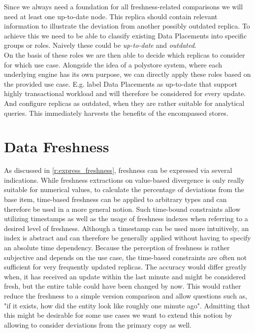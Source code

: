 Since we always need a foundation for all freshness-related comparisons we will need at least one up-to-date node. 
This replica should contain relevant information to illustrate the deviation from another possibly outdated replica.
To achieve this we need to be able to classify existing Data Placements into specific groups or roles.
Naively these could be \emph{up-to-date} and \emph{outdated}.\\
On the basis of these roles we are then able to decide which replicas to consider for which use case.
Alongside the idea of a polystore system, where each underlying engine has its own purpose, we can directly apply these roles 
based on the provided use case. E.g. label Data Placements as up-to-date that support highly transactional workload and will therefore be considered for every update.
And configure replicas as outdated, when they are rather suitable for analytical queries.
This immediately harvests the benefits of the encompassed stores. \\








\section{Data Freshness}
\label{express}

As discussed in \ref{r:express_freshness}, freshness can be expressed via several indications.
While freshness extractions on value-based divergence is only really suitable for numerical values,
to calculate the percentage of deviations from the base item, time-based freshness can be applied to arbitrary types and can therefore be used 
in a more general notion. 
Such time-bound constraints allow utilizing timestamps as well as the usage of freshness indexes when referring to a desired level of freshness. 
Although a timestamp can be used more intuitively, an index is abstract and can therefore be generally applied without having to specify an absolute time dependency.
Because the perception of freshness is rather subjective and depends on the use case, the time-based constraints are often not sufficient for very frequently updated replicas.
The accuracy would differ greatly when, it has received an update within the last minute and might be considered fresh, but the entire table could have been 
changed by now. This would rather reduce the freshness to a simple version comparison and allow questions such as, "if it exists, how did the entity look like roughly one minute ago".
Admitting that this might be desirable for some use cases we want to extend this notion by allowing to consider deviations from the primary copy as well. 

